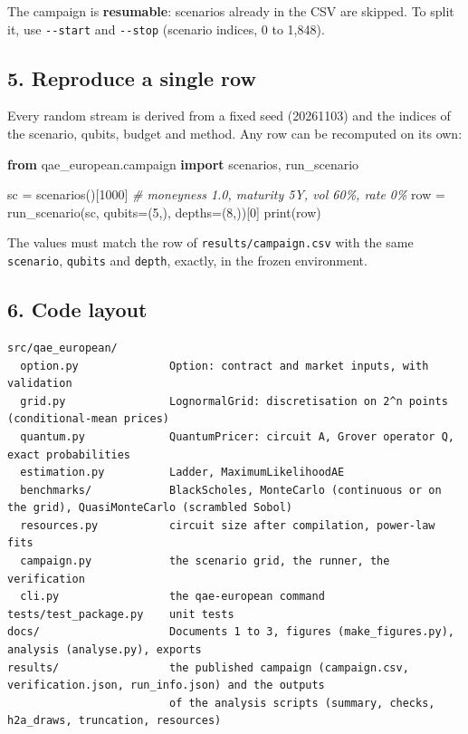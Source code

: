\documentclass[
  10pt,
]{article}
\newenvironment{Shaded}{}{}
\newcommand{\BuiltInTok}[1]{\textcolor[rgb]{0.00,0.50,0.00}{#1}}
\newcommand{\CommentTok}[1]{\textcolor[rgb]{0.38,0.63,0.69}{\textit{#1}}}
\newcommand{\DecValTok}[1]{\textcolor[rgb]{0.25,0.63,0.44}{#1}}
\newcommand{\ImportTok}[1]{\textcolor[rgb]{0.00,0.50,0.00}{\textbf{#1}}}
\newcommand{\NormalTok}[1]{#1}
\newcommand{\OperatorTok}[1]{\textcolor[rgb]{0.40,0.40,0.40}{#1}}
\begin{document}
The campaign is \textbf{resumable}: scenarios already in the CSV are
skipped. To split it, use \texttt{-\/-start} and \texttt{-\/-stop}
(scenario indices, 0 to 1,848).

\hypertarget{5-reproduce-a-single-row}{%
\subsection{5. Reproduce a single row}\label{5-reproduce-a-single-row}}

Every random stream is derived from a fixed seed (20261103) and the
indices of the scenario, qubits, budget and method. Any row can be
recomputed on its own:

\begin{Shaded}
\begin{Highlighting}[]
\ImportTok{from}\NormalTok{ qae\_european.campaign }\ImportTok{import}\NormalTok{ scenarios, run\_scenario}

\NormalTok{sc }\OperatorTok{=}\NormalTok{ scenarios()[}\DecValTok{1000}\NormalTok{]                      }\CommentTok{\# moneyness 1.0, maturity 5Y, vol 60\%, rate 0\%}
\NormalTok{row }\OperatorTok{=}\NormalTok{ run\_scenario(sc, qubits}\OperatorTok{=}\NormalTok{(}\DecValTok{5}\NormalTok{,), depths}\OperatorTok{=}\NormalTok{(}\DecValTok{8}\NormalTok{,))[}\DecValTok{0}\NormalTok{]}
\BuiltInTok{print}\NormalTok{(row)}
\end{Highlighting}
\end{Shaded}

The values must match the row of \texttt{results/campaign.csv} with the
same \texttt{scenario}, \texttt{qubits} and \texttt{depth}, exactly, in
the frozen environment.

\hypertarget{6-code-layout}{%
\subsection{6. Code layout}\label{6-code-layout}}

\begin{verbatim}
src/qae_european/
  option.py              Option: contract and market inputs, with validation
  grid.py                LognormalGrid: discretisation on 2^n points (conditional-mean prices)
  quantum.py             QuantumPricer: circuit A, Grover operator Q, exact probabilities
  estimation.py          Ladder, MaximumLikelihoodAE
  benchmarks/            BlackScholes, MonteCarlo (continuous or on the grid), QuasiMonteCarlo (scrambled Sobol)
  resources.py           circuit size after compilation, power-law fits
  campaign.py            the scenario grid, the runner, the verification
  cli.py                 the qae-european command
tests/test_package.py    unit tests
docs/                    Documents 1 to 3, figures (make_figures.py), analysis (analyse.py), exports
results/                 the published campaign (campaign.csv, verification.json, run_info.json) and the outputs
                         of the analysis scripts (summary, checks, h2a_draws, truncation, resources)
\end{verbatim}
\end{document}
